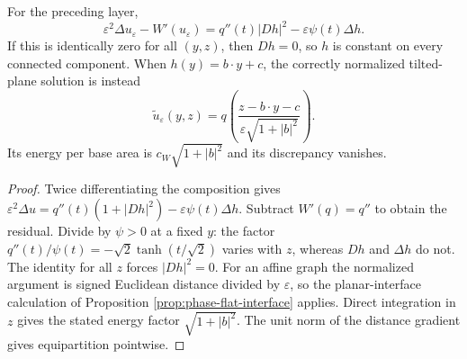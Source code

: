 \begin{example}\label{ex:phase-vertical-graph-residual}
For the preceding layer,
\[
 \varepsilon^2\Delta u_\varepsilon-W'(u_\varepsilon)
   =q''(t)|Dh|^2-\varepsilon\psi(t)\Delta h.
\]
If this is identically zero for all $(y,z)$, then $Dh=0$, so $h$ is constant on every connected component. When $h(y)=b\cdot y+c$, the correctly normalized tilted-plane solution is instead
\[
 \widetilde u_\varepsilon(y,z)
  =q\left(\frac{z-b\cdot y-c}{\varepsilon\sqrt{1+|b|^2}}\right).
\]
Its energy per base area is $c_W\sqrt{1+|b|^2}$ and its discrepancy vanishes.
\end{example}
\begin{proof}
Twice differentiating the composition gives
$\varepsilon^2\Delta u=q''(t)(1+|Dh|^2)-\varepsilon\psi(t)\Delta h$.
Subtract $W'(q)=q''$ to obtain the residual. Divide by $\psi>0$ at a fixed $y$: the factor $q''(t)/\psi(t)=-\sqrt2\tanh(t/\sqrt2)$ varies with $z$, whereas $Dh$ and $\Delta h$ do not. The identity for all $z$ forces $|Dh|^2=0$. For an affine graph the normalized argument is signed Euclidean distance divided by $\varepsilon$, so the planar-interface calculation of Proposition \ref{prop:phase-flat-interface} applies. Direct integration in $z$ gives the stated energy factor $\sqrt{1+|b|^2}$. The unit norm of the distance gradient gives equipartition pointwise.
\end{proof}

